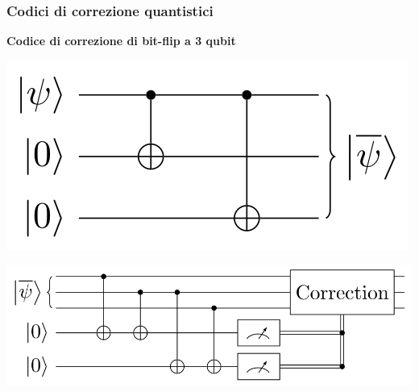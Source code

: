 \documentclass[aspectratio=169]{beamer}
\begin{document}
\begin{frame}
	\frametitle{Codici di correzione quantistici}
	\begin{minipage}{\textwidth}
		\textbf{Codice di correzione di bit-flip a 3 qubit}\\
		\centering
		\begin{minipage}{0.30\textwidth}
			\centering
			\includegraphics[scale=0.22]{bit-flip-encode.png}
		\end{minipage}
		\begin{minipage}{0.68\textwidth}
			\centering
			\includegraphics[scale=0.23]{bit-flip-detect.png}

		\end{minipage}
		\vspace{20pt}


\end{minipage}
\end{frame}
\end{document}
